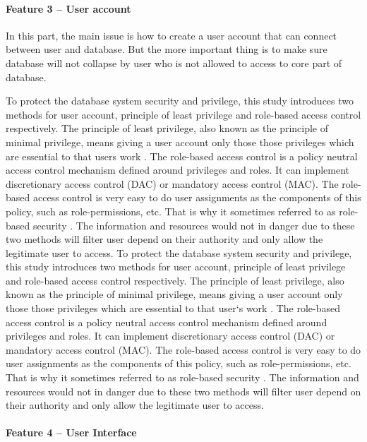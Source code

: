 \documentclass[a4paper]{article} %
\begin{document}
	\paragraph*{Feature 3 -- User account}
	\label{task1:feature3}
	
	In this part, the main issue is how to create a user account that can connect between user and database. But the more important thing is to make sure database will not collapse by user who is not allowed to access to core part of database.
	
	To protect the database system security and privilege, this study introduces two methods for user account, principle of least privilege and role-based access control respectively. The principle of least privilege, also known as the principle of minimal privilege, means giving a user account only those those privileges which are essential to that users work \cite{PrincipleLeastPrivilege}. The role-based access control is a policy neutral access control mechanism defined around privileges and roles. It can implement discretionary access control (DAC) or mandatory access control (MAC). The role-based access control is very easy to do user assignments as the components of this policy, such as role-permissions, etc. That is why it sometimes referred to as role-based security \cite{RoleBasedAccessControl}. The information and resources would not in danger due to these two methods will filter user depend on their authority and only allow the legitimate user to access.	
	To protect the database system security and privilege, this study introduces two methods for user account, principle of least privilege and role-based access control respectively. The principle of least privilege, also known as the principle of minimal privilege, means giving a user account only those those privileges which are essential to that user`s work \cite{PrincipleLeastPrivilege}. The role-based access control is a policy neutral access control mechanism defined around privileges and roles. It can implement discretionary access control (DAC) or mandatory access control (MAC). The role-based access control is very easy to do user assignments as the components of this policy, such as role-permissions, etc. That is why it sometimes referred to as role-based security \cite{RoleBasedAccessControl}. The information and resources would not in danger due to these two methods will filter user depend on their authority and only allow the legitimate user to access.
	
	\paragraph*{Feature 4 -- User Interface}
	\label{task1:feature4}
	
\end{document}
